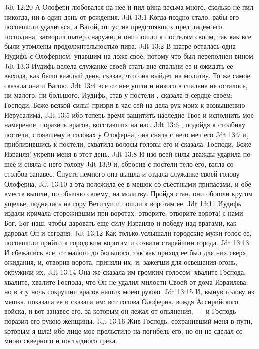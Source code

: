 \vs Jdt 12:20 А Олоферн любовался на нее и пил вина весьма много, сколько не пил никогда, ни в один день от рождения.
\vs Jdt 13:1 Когда поздно стало, рабы его поспешили удалиться, а Вагой, отпустив предстоявших пред лицем его господина, затворил шатер снаружи, и они пошли к постелям своим, так как все были утомлены продолжительностью пира.
\vs Jdt 13:2 В шатре осталась одна Иудифь с Олоферном, упавшим на ложе свое, потому что был переполнен вином.
\vs Jdt 13:3 Иудифь велела служанке своей стать вне спальни ее и ожидать ее выхода, как было каждый день, сказав, что она выйдет на молитву. То же самое сказала она и Вагою.
\vs Jdt 13:4  все от нее ушли и никого в спальне не осталось, ни малого, ни большого, Иудифь, став у постели , сказала в сердце своем: Господи, Боже всякой силы! призри в час сей на дела рук моих к возвышению Иерусалима,
\vs Jdt 13:5 ибо теперь время защитить наследие Твое и исполнить мое намерение, поразить врагов, восставших на нас.
\vs Jdt 13:6 , подойдя к столбику постели, стоявшему в головах у Олоферна, она сняла с него меч его
\vs Jdt 13:7 и, приблизившись к постели, схватила волосы головы его и сказала: Господи, Боже Израиля! укрепи меня в этот день.
\vs Jdt 13:8 И изо всей силы дважды ударила по шее  и сняла с него голову
\vs Jdt 13:9 и, сбросив с постели тело его, взяла со столбов занавес. Спустя немного она вышла и отдала служанке своей голову Олоферна,
\vs Jdt 13:10 а эта положила ее в мешок со съестными припасами, и обе вместе вышли, по обычаю своему, на молитву. Пройдя стан, они обошли кругом ущелье, поднялись на гору Ветилуи и пошли к воротам ее.
\vs Jdt 13:11 Иудифь издали кричала сторожившим при воротах: отворите, отворите ворота! с нами Бог, Бог наш, чтобы даровать еще силу Израилю и победу над врагами, как даровал Он и сегодня.
\vs Jdt 13:12 Как только услышали городские мужи голос ее, поспешили прийти к городским воротам и созвали старейшин города.
\vs Jdt 13:13 И сбежались все, от малого до большого, так как приход ее был для них сверх ожидания, и, отворив ворота, приняли их, и, зажегши для освещения огонь, окружили их.
\vs Jdt 13:14 Она же сказала им громким голосом: хвалите Господа, хвалите, хвалите Господа, что Он не удалил милости Своей от дома Израилева, но в эту ночь сокрушил врагов наших моею рукою.
\vs Jdt 13:15 И, вынув голову из мешка, показала ее и сказала им: вот голова Олоферна, вождя Ассирийского войска, и вот занавес его, за которым он лежал от опьянения,~--- и Господь поразил его рукою женщины.
\vs Jdt 13:16 Жив Господь, сохранивший меня в пути, которым я шла! ибо лице мое прельстило  на погибель его, но он не сделал со мною скверного и постыдного греха.
